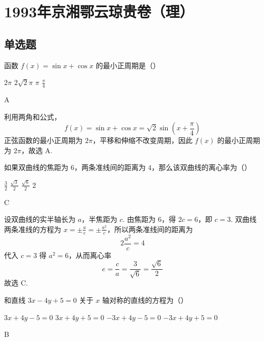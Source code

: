 \chapter{1993年京湘鄂云琼贵卷（理）}
\section{单选题}

\begin{problem}
函数 \(f(x)=\sin x+\cos x\) 的最小正周期是（\quad）

\choices
    {\(2\pi\)}
    {\(2\sqrt{2}\pi\)}
    {\(\pi\)}
    {\(\frac{\pi}{4}\)}
\end{problem}

\begin{answer}
A
\end{answer}

\begin{solution}
利用两角和公式，
\[
f(x)=\sin x+\cos x=\sqrt{2}\sin\left(x+\frac{\pi}{4}\right)
\]
正弦函数的最小正周期为 \(2\pi\)，平移和伸缩不改变周期，因此 \(f(x)\) 的最小正周期为 \(2\pi\)，故选 A.
\end{solution}

\begin{problem}
如果双曲线的焦距为 \(6\)，两条准线间的距离为 \(4\)，那么该双曲线的离心率为（\quad）

\choices
    {\(\frac{3}{2}\)}
    {\(\frac{\sqrt{3}}{2}\)}
    {\(\frac{\sqrt{6}}{2}\)}
    {\(2\)}
\end{problem}

\begin{answer}
C
\end{answer}

\begin{solution}
设双曲线的实半轴长为 \(a\)，半焦距为 \(c\). 由焦距为 \(6\)，得 \(2c=6\)，即 \(c=3\). 双曲线两条准线的方程为 \(x=\pm\frac{a}{e}=\pm\frac{a^2}{c}\)，所以两条准线间的距离为
\[
2\frac{a^2}{c}=4
\]
代入 \(c=3\) 得 \(a^2=6\)，从而离心率
\[
e=\frac{c}{a}=\frac{3}{\sqrt{6}}=\frac{\sqrt{6}}{2}
\]
故选 C.
\end{solution}

\begin{problem}
和直线 \(3x-4y+5=0\) 关于 \(x\) 轴对称的直线的方程为（\quad）

\choices
    {\(3x+4y-5=0\)}
    {\(3x+4y+5=0\)}
    {\(-3x+4y-5=0\)}
    {\(-3x+4y+5=0\)}
\end{problem}

\begin{answer}
B
\end{answer}

